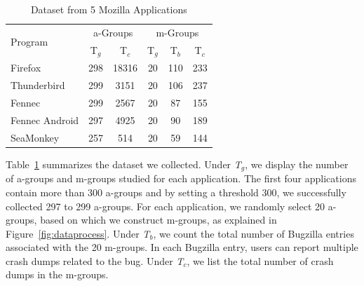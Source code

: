 \documentclass{llncs}
\begin{document}
\begin{table}
\caption{Dataset from 5 Mozilla Applications\label{tab:dataset}}
\center
\begin{tabular}{|l||c|c||c|c|c|}\hline

\multirow{2}{*}{Program} & \multicolumn{2}{|c||}{a-Groups} & \multicolumn{3}{|c|}{m-Groups} \\\cline{2-6}

&T$_g$&T$_c$&T$_g$&T$_b$&T$_c$ \\ \hline\hline

  Firefox &298&18316&20&110&233\\ \hline
  Thunderbird &299&3151&20&106&237\\ \hline
  Fennec &299&2567&20&87&155\\ \hline
  Fennec Android &297&4925&20&90&189\\ \hline
  SeaMonkey & 257&514&20&59&144\\ \hline


\end{tabular}
\end{table}

Table~\ref{tab:dataset} summarizes the dataset we collected. Under {\it T$_g$}, we display the number of a-groups and m-groups studied for each application. The first four applications contain more than 300 a-groups and by setting a threshold 300, we successfully collected 297 to 299 a-groups. For each application, we randomly select 20 a-groups, based on which we construct m-groups, as explained in Figure~\ref{fig:dataprocess}. Under {\it T$_b$}, we count the total number of Bugzilla entries associated with the 20 m-groups. In each Bugzilla entry, users can report multiple crash dumps related to the bug. Under {\it T$_c$}, we list the total number of crash dumps in the m-groups.

\end{document}
